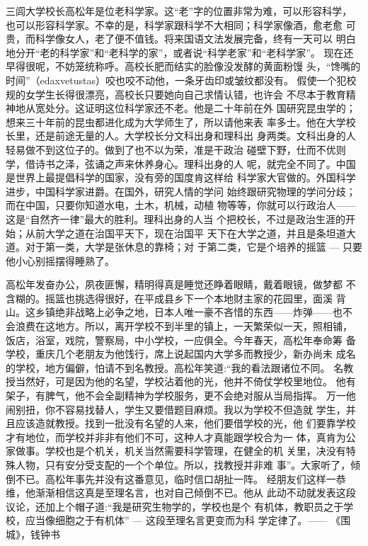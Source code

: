 \begin{advisorInfo} %
  三闾大学校长高松年是位老科学家。这“老”字的位置非常为难，可以形容科学，
  也可以形容科学家。不幸的是，科学家跟科学不大相同；科学家像酒，愈老愈
  可贵，而科学像女人，老了便不值钱。将来国语文法发展完备，终有一天可以
  明白地分开“老的科学家”和“老科学的家”，或者说“科学老家”和“老科学家”。
  现在还早得很呢，不妨笼统称呼。高校长肥而结实的脸像没发酵的黄面粉馒
  头，“馋嘴的时间”（edaxvetustas）咬也咬不动他，一条牙齿印或皱纹都没有。
  假使一个犯校规的女学生长得很漂亮，高校长只要她向自己求情认错，也许会
  不尽本于教育精神地从宽处分。这证明这位科学家还不老。他是二十年前在外
  国研究昆虫学的；想来三十年前的昆虫都进化成为大学师生了，所以请他来表
  率多士。他在大学校长里，还是前途无量的人。大学校长分文科出身和理科出
  身两类。文科出身的人轻易做不到这位子的。做到了也不以为荣，准是干政治
  碰壁下野，仕而不优则学，借诗书之泽，弦诵之声来休养身心。理科出身的人
  呢，就完全不同了。中国是世界上最提倡科学的国家，没有旁的国度肯这样给
  科学家大官做的。外国科学进步，中国科学家进爵。在国外，研究人情的学问
  始终跟研究物理的学问分歧；而在中国，只要你知道水电，土木，机械，动植
  物等等，你就可以行政治人——这是“自然齐一律”最大的胜利。理科出身的人当
  个把校长，不过是政治生涯的开始；从前大学之道在治国平天下，现在治国平
  天下在大学之道，并且是条坦道大道。对于第一类，大学是张休息的靠椅；对
  于第二类，它是个培养的摇篮 --- 只要他小心别摇摆得睡熟了。

  高松年发奋办公，夙夜匪懈，精明得真是睡觉还睁着眼睛，戴着眼镜，做梦都
  不含糊的。摇篮也挑选得很好，在平成县乡下一个本地财主家的花园里，面溪
  背山。这乡镇绝非战略上必争之地，日本人唯一豪不吝惜的东西——炸弹——也不
  会浪费在这地方。所以，离开学校不到半里的镇上，一天繁荣似一天，照相铺，
  饭店，浴室，戏院，警察局，中小学校，一应俱全。今年春天，高松年奉命筹
  备学校，重庆几个老朋友为他饯行，席上说起国内大学多而教授少，新办尚未
  成名的学校，地方偏僻，怕请不到名教授。高松年笑道:“我的看法跟诸位不同。
  名教授当然好，可是因为他的名望，学校沾着他的光，他并不倚仗学校里地位。
  他有架子，有脾气，他不会全副精神为学校服务，更不会绝对服从当局指挥。
  万一他闹别扭，你不容易找替人，学生又要借题目麻烦。我以为学校不但造就
  学生，并且应该造就教授。找到一批没有名望的人来，他们要借学校的光，他
  们要靠学校才有地位，而学校并非非有他们不可，这种人才真能跟学校合为一
  体，真肯为公家做事。学校也是个机关，机关当然需要科学管理，在健全的机
  关里，决没有特殊人物，只有安分受支配的一个个单位。所以，找教授并非难
  事”。大家听了，倾倒不已。高松年事先并没有这番意见，临时信口胡扯一阵。
  经朋友们这样一恭维，他渐渐相信这真是至理名言，也对自己倾倒不已。他从
  此动不动就发表这段议论，还加上个帽子道:“我是研究生物学的，学校也是个
  有机体，教职员之于学校，应当像细胞之于有机体” --- 这段至理名言更变而为科
  学定律了。\qquad{}------ 《围城》，钱钟书
\end{advisorInfo}

